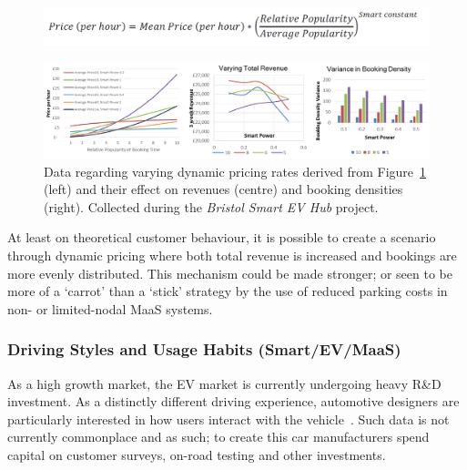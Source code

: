 \documentclass[journal]{IEEEtran}
\begin{document}
\begin{figure}[!htb]
\centering
\includegraphics[width=\columnwidth]{images/smartpricingformula.png}
\label{fig:smartpricingformula}
\end{figure}

\begin{figure}[!htb]
\centering
\includegraphics[width=\textwidth]{images/smartpricegraphs.png}
\caption{Data regarding varying dynamic pricing rates derived from Figure~\ref{fig:smartpricingformula} (left) and their effect on revenues (centre) and booking densities (right). Collected during the {\emph{Bristol Smart EV Hub}} project.}
\label{fig:smartpricegraphs}
\end{figure}


At least on theoretical customer behaviour, it is possible to create a
scenario through dynamic pricing where both total revenue is increased
and bookings are more evenly distributed. This mechanism could be made
stronger; or seen to be more of a `carrot' than a `stick' strategy by
the use of reduced parking costs in non- or limited-nodal MaaS
systems.

\subsubsection{Driving Styles and Usage Habits (Smart/EV/MaaS)} 

As a high growth market, the EV market is currently undergoing heavy
R\&D investment. As a distinctly different driving experience,
automotive designers are particularly interested in how users interact
with the vehicle~\cite{ferreira-et-al:2013}. Such data is not
currently commonplace and as such; to create this car manufacturers
spend capital on customer surveys, on-road testing and other
investments.
\end{document}
